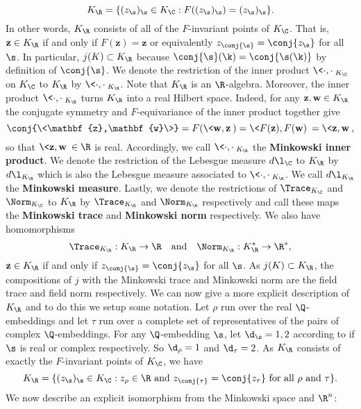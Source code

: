     \[
      K_{\R} = \{(z_{\s})_{\s} \in K_{\C}:F((z_{\s})_{\s}) = (z_{\s})_{\s}\}.
    \]
    In other words, $K_{\R}$ consists of all of the $F$-invariant points of $K_{\C}$. That is, $\mathbf{z} \in K_{\R}$ if and only if $F(\mathbf{z}) = \mathbf{z}$ or equivalently $z_{\conj{\s}} = \conj{z_{\s}}$ for all $\s$. In particular, $j(K) \subset K_{\R}$ because $\conj{\s}(\k) = \conj{\s(\k)}$ by definition of $\conj{\s}$. We denote the restriction of the inner product $\<\cdot,\cdot\>_{K_{\C}}$ on $K_{\C}$ to $K_{\R}$ by $\<\cdot,\cdot\>_{K_{\R}}$. Note that $K_{\R}$ is an $\R$-algebra. Moreover, the inner product $\<\cdot,\cdot\>_{K_{\R}}$ turns $K_{\R}$ into a real Hilbert space. Indeed, for any $\mathbf{z},\mathbf{w} \in K_{\R}$ the conjugate symmetry and $F$-equivariance of the inner product together give
    \[
      \conj{\<\mathbf{z},\mathbf{w}\>} = F(\<\mathbf{w},\mathbf{z}\>) = \<F(\mathbf{z}),F(\mathbf{w})\> = \<\mathbf{z},\mathbf{w}\>,
    \]
    so that $\<\mathbf{z},\mathbf{w}\> \in \R$ is real. Accordingly, we call $\<\cdot,\cdot\>_{K_{\R}}$ the \textbf{Minkowski inner product}. We denote the restriction of the Lebesgue measure $d\l_{\C}$ to $K_{\R}$ by $d\l_{K_{\R}}$ which is also the Lebesgue measure associated to $\<\cdot,\cdot\>_{K_{\R}}$. We call $d\l_{K_{\R}}$ the \textbf{Minkowski measure}. Lastly, we denote the restrictions of $\Trace_{K_{\C}}$ and $\Norm_{K_{\C}}$ to $K_{\R}$ by $\Trace_{K_{\R}}$ and $\Norm_{K_{\R}}$ respectively and call these maps the \textbf{Minkowski trace} and \textbf{Minkowski norm} respectively. We also have homomorphisms
    \[
      \Trace_{K_{\R}}:K_{\R} \to \R \quad \text{and} \quad \Norm_{K_{\R}}:K_{\R}^{\ast} \to \R^{\ast},
    \]
    $\mathbf{z} \in K_{\R}$ if and only if $z_{\conj{\s}} = \conj{z_{\s}}$ for all $\s$. As $j(K) \subset K_{\R}$, the compositions of $j$ with the Minkowski trace and Minkowski norm are the field trace and field norm respectively. We can now give a more explicit description of $K_{\R}$ and to do this we setup some notation. Let $\rho$ run over the real $\Q$-embeddings and let $\tau$ run over a complete set of representatives of the pairs of complex $\Q$-embeddings. For any $\Q$-embedding $\s$, let $\d_{\s} = 1,2$ according to if $\s$ is real or complex respectively. So $\d_{\rho} = 1$ and $\d_{\tau} = 2$. As $K_{\R}$ consists of exactly the $F$-invariant points of $K_{\C}$, we have
    \[
      K_{\R} = \{(z_{\s})_{\s} \in K_{\C}:\text{$z_{\rho} \in \R$ and $z_{\conj{\tau}} = \conj{z_{\tau}}$ for all $\rho$ and $\tau$}\}.
    \]
    We now describe an explicit isomorphism from the Minkowski space and $\R^{n}$:
    
